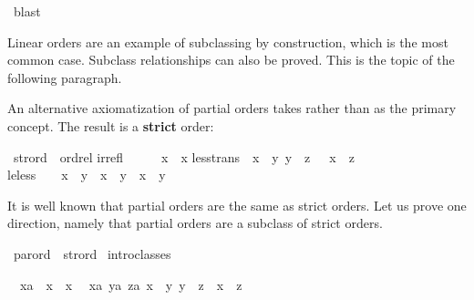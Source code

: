 \begin{isabellebody}
\ blast\isanewline
{}\isamarkupfalse%
%
\endisatagproof
{\isafoldproof}%
%
\isadelimproof
%
\endisadelimproof
%
\begin{isamarkuptext}%
Linear orders are an example of subclassing
by construction, which is the most
common case.  Subclass relationships can also be proved.  
This is the topic of the following
paragraph.%
\end{isamarkuptext}%
\isamarkuptrue%
%
\isamarkuptrue%
%
\begin{isamarkuptext}%
An alternative axiomatization of partial orders takes \isa{{\isacharless}{\isacharless}} rather than
\isa{{\isacharless}{\isacharless}{\isacharequal}} as the primary concept. The result is a \textbf{strict} order:%
\end{isamarkuptext}%
\isamarkuptrue%
\isamarkupfalse%
\ strord\ {\isacharless}\ ordrel\isanewline
irrefl{\isacharcolon}\ \ \ \ \ {\isachardoublequoteopen}{\isasymnot}\ x\ {\isacharless}{\isacharless}\ x{\isachardoublequoteclose}\isanewline
less{\isacharunderscore}trans{\isacharcolon}\ {\isachardoublequoteopen}{\isasymlbrakk}\ x\ {\isacharless}{\isacharless}\ y{\isacharsemicolon}\ y\ {\isacharless}{\isacharless}\ z\ {\isasymrbrakk}\ {\isasymLongrightarrow}\ x\ {\isacharless}{\isacharless}\ z{\isachardoublequoteclose}\isanewline
le{\isacharunderscore}less{\isacharcolon}\ \ \ \ {\isachardoublequoteopen}x\ {\isacharless}{\isacharless}{\isacharequal}\ y\ {\isacharequal}\ {\isacharparenleft}x\ {\isacharless}{\isacharless}\ y\ {\isasymor}\ x\ {\isacharequal}\ y{\isacharparenright}{\isachardoublequoteclose}%
\begin{isamarkuptext}%
\noindent
It is well known that partial orders are the same as strict orders. Let us
prove one direction, namely that partial orders are a subclass of strict
orders.%
\end{isamarkuptext}%
\isamarkuptrue%
\isamarkupfalse%
\ parord\ {\isacharless}\ strord\isanewline
%
\isadelimproof
%
\endisadelimproof
%
\isatagproof
{}\isamarkupfalse%
\ intro{\isacharunderscore}classes%
\begin{isamarkuptxt}%
\noindent
\begin{isabelle}%
\ {}{\isachardot}\ {\isasymAnd}x{\isasymColon}{\isacharprime}a{\isachardot}\ {\isasymnot}\ x\ {\isacharless}{\isacharless}\ x\isanewline
\ {}{\isachardot}\ {\isasymAnd}{\isacharparenleft}x{\isasymColon}{\isacharprime}a{\isacharparenright}\ {\isacharparenleft}y{\isasymColon}{\isacharprime}a{\isacharparenright}\ z{\isasymColon}{\isacharprime}a{\isachardot}\ {\isasymlbrakk}x\ {\isacharless}{\isacharless}\ y{\isacharsemicolon}\ y\ {\isacharless}{\isacharless}\ z{\isasymrbrakk}\ {\isasymLongrightarrow}\ x\ {\isacharless}{\isacharless}\ z\isanewline

\end{isabelle}
\end{isamarkuptxt}
\end{isabellebody}
